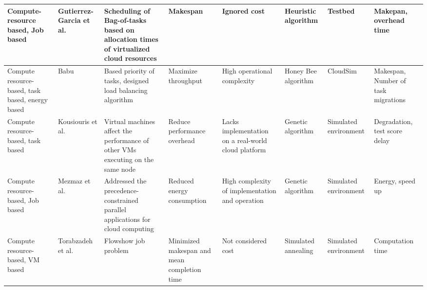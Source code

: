 \begin{sidewaystable*}[!htbp]
{\begin{tabular}{|g{2cm} p{2cm} p{2cm} p{2cm} p{2cm} p{2cm} p{2cm} p{2cm}|}
 Compute-resource based, Job based & Gutierrez-Garcia et al.~\cite{gutierrez2013family} & Scheduling of Bag-of-tasks based on allocation times of virtualized cloud resources & Makespan & Ignored cost & Heuristic algorithm &  Testbed & Makepan, overhead time
\\ \hline

Compute resource-based, task based, energy based & Babu~\cite{ld2013honey} & Based  priority of tasks, designed load balancing algorithm & Maximize throughput & High operational complexity & Honey Bee algorithm & CloudSim & Makespan, Number of task migrations
\\ \hline

Compute resource-based, task based & Kousiouris et al.~\cite{kousiouris2011effects}& Virtual machines affect the performance of other VMs executing on the same node & Reduce performance overhead & Lacks implementation on a real-world cloud platform  & Genetic algorithm  &  Simulated environment & Degradation, test score delay
\\ \hline

Compute resource-based, Job based & Mezmaz et al.~\cite{mezmaz2011parallel} & Addressed the precedence-constrained parallel applications for cloud computing & Reduced energy consumption & High complexity of implementation and operation& Genetic algorithm & Simulated environment & Energy, speed up
\\ \hline


Compute resource-based, VM based & Torabzadeh et al.~\cite{torabzadeh2010cloud} & Flowshow job problem  & Minimized makespan and mean completion time & Not considered cost & Simulated annealing & Simulated environment & Computation time
\\ \hline


\end{tabular}
}

\end{sidewaystable*}
